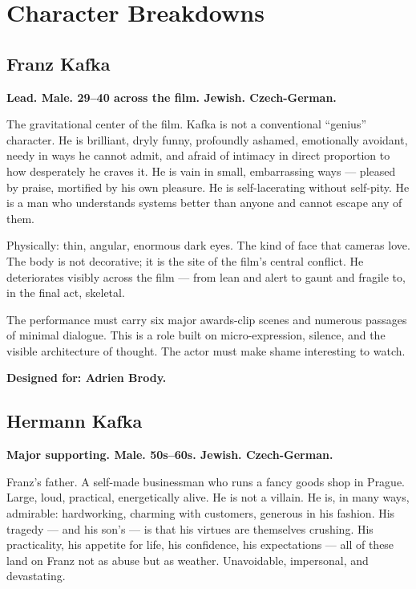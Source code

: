 
\section{Character Breakdowns}

\subsection{Franz Kafka}
\textbf{Lead. Male. 29--40 across the film. Jewish. Czech-German.}

The gravitational center of the film. Kafka is not a conventional ``genius'' character. He is brilliant, dryly funny, profoundly ashamed, emotionally avoidant, needy in ways he cannot admit, and afraid of intimacy in direct proportion to how desperately he craves it. He is vain in small, embarrassing ways --- pleased by praise, mortified by his own pleasure. He is self-lacerating without self-pity. He is a man who understands systems better than anyone and cannot escape any of them.

Physically: thin, angular, enormous dark eyes. The kind of face that cameras love. The body is not decorative; it is the site of the film's central conflict. He deteriorates visibly across the film --- from lean and alert to gaunt and fragile to, in the final act, skeletal.

The performance must carry six major awards-clip scenes and numerous passages of minimal dialogue. This is a role built on micro-expression, silence, and the visible architecture of thought. The actor must make shame interesting to watch.

\textbf{Designed for: Adrien Brody.}

\subsection{Hermann Kafka}
\textbf{Major supporting. Male. 50s--60s. Jewish. Czech-German.}

Franz's father. A self-made businessman who runs a fancy goods shop in Prague. Large, loud, practical, energetically alive. He is not a villain. He is, in many ways, admirable: hardworking, charming with customers, generous in his fashion. His tragedy --- and his son's --- is that his virtues are themselves crushing. His practicality, his appetite for life, his confidence, his expectations --- all of these land on Franz not as abuse but as weather. Unavoidable, impersonal, and devastating.

